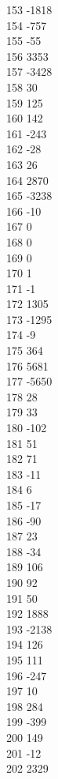 { 153	-1818 \\
 154	-757 \\
 155	-55 \\
 156	3353 \\
 157	-3428 \\
 158	30 \\
 159	125 \\
 160	142 \\
 161	-243 \\
 162	-28 \\
 163	26 \\
 164	2870 \\
 165	-3238 \\
 166	-10 \\
 167	0 \\
 168	0 \\
 169	0 \\
 170	1 \\
 171	-1 \\
 172	1305 \\
 173	-1295 \\
 174	-9 \\
 175	364 \\
 176	5681 \\
 177	-5650 \\
 178	28 \\
 179	33 \\
 180	-102 \\
 181	51 \\
 182	71 \\
 183	-11 \\
 184	6 \\
 185	-17 \\
 186	-90 \\
 187	23 \\
 188	-34 \\
 189	106 \\
 190	92 \\
 191	50 \\
 192	1888 \\
 193	-2138 \\
 194	126 \\
 195	111 \\
 196	-247 \\
 197	10 \\
 198	284 \\
 199	-399 \\
 200	149 \\
 201	-12 \\
 202	2329 \\
}
